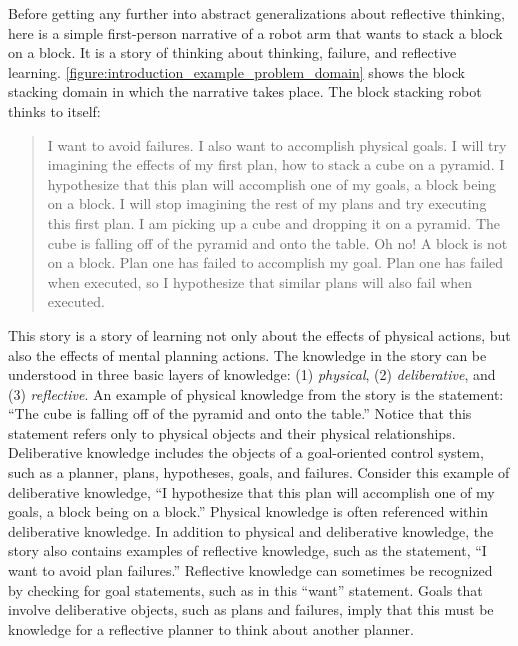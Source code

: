 Before getting any further into abstract generalizations about
reflective thinking, here is a simple first-person narrative of a
robot arm that wants to stack a block on a block.  It is a story of
thinking about thinking, failure, and reflective learning.
{\autoref{figure:introduction_example_problem_domain}} shows the block
stacking domain in which the narrative takes place.  The block
stacking robot thinks to itself:
\begin{quote}
  I want to avoid failures.  I also want to accomplish physical goals.
  I will try imagining the effects of my first plan, how to stack a
  cube on a pyramid.  I hypothesize that this plan will accomplish one
  of my goals, a block being on a block.  I will stop imagining the
  rest of my plans and try executing this first plan.  I am picking up
  a cube and dropping it on a pyramid.  The cube is falling off of the
  pyramid and onto the table.  Oh no!  A block is not on a block.
  Plan one has failed to accomplish my goal.  Plan one has failed when
  executed, so I hypothesize that similar plans will also fail when
  executed.
\end{quote}
This story is a story of learning not only about the effects of
physical actions, but also the effects of mental planning actions.
The knowledge in the story can be understood in three basic layers of
knowledge: (1) {\emph{physical}}, (2) {\emph{deliberative}}, and (3)
{\emph{reflective}}.  An example of physical knowledge from the story
is the statement: ``The cube is falling off of the pyramid and onto
the table.''  Notice that this statement refers only to physical
objects and their physical relationships.  Deliberative knowledge
includes the objects of a goal-oriented control system, such as a
planner, plans, hypotheses, goals, and failures.  Consider this
example of deliberative knowledge, ``I hypothesize that this plan will
accomplish one of my goals, a block being on a block.''  Physical
knowledge is often referenced within deliberative knowledge.  In
addition to physical and deliberative knowledge, the story also
contains examples of reflective knowledge, such as the statement, ``I
want to avoid plan failures.''  Reflective knowledge can sometimes be
recognized by checking for goal statements, such as in this ``want''
statement.  Goals that involve deliberative objects, such as plans and
failures, imply that this must be knowledge for a reflective planner
to think about another planner.









